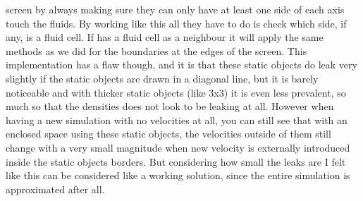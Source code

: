 \documentclass{article}
\begin{document}
\begin{multicols}{2}%
\noindent%
screen by always making sure they can only have at least one side of each axis touch the fluids. By working like this all they have to do is check which side, if any, is a fluid cell. If has a fluid cell as a neighbour it will apply the same methods as we did for the boundaries at the edges of the screen. This implementation has a flaw though, and it is that these static objects do leak very slightly if the static objects are drawn in a diagonal line, but it is barely noticeable and with thicker static objects (like 3x3) it is even less prevalent, so much so that the densities does not look to be leaking at all. However when having a new simulation with no velocities at all, you can still see that with an enclosed space using these static objects, the velocities outside of them still change with a very small magnitude when new velocity is externally introduced inside the static objects borders. But considering how small the leaks are I felt like this can be considered like a working solution, since the entire simulation is approximated after all.
%

\end{multicols}
\end{document}
